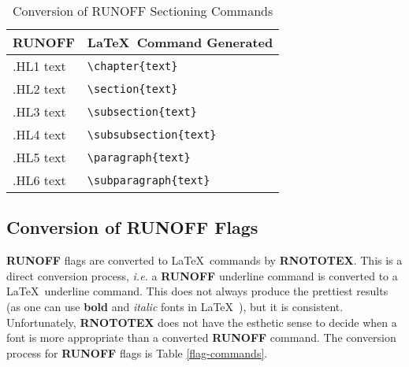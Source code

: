 \begin{table}[h]
\begin{center}
\begin{tabular}{ll}
{\large\bf RUNOFF }	    & {\LaTeX\ \large\bf Command Generated} \\ \hline
 .HL1 text      & \verb+\chapter{text}+ \\
 .HL2 text      & \verb+\section{text}+ \\
 .HL3 text      & \verb+\subsection{text}+ \\
 .HL4 text      & \verb+\subsubsection{text}+ \\
 .HL5 text      & \verb+\paragraph{text}+ \\
 .HL6 text      & \verb+\subparagraph{text}+ \\ \hline
\end{tabular}
\caption{Conversion of RUNOFF Sectioning Commands\label{section-commands}}
\end{center}
\end{table}

\subsection{Conversion of RUNOFF Flags}

{\bf RUNOFF} flags are converted to \LaTeX\ commands by {\bf RNOTOTEX}.   This
is a direct conversion process, {\em i.e.} a {\bf RUNOFF} underline command is
converted to a \LaTeX\ underline command.  This does not always produce the
prettiest results (as one can use {\bf bold} and {\it italic} fonts in \LaTeX\
), but it is consistent.  Unfortunately, {\bf RNOTOTEX} does not have the
esthetic sense to decide when a font is more appropriate than \index{esthetic
sense} a converted {\bf RUNOFF} command.  The conversion process for {\bf
RUNOFF} flags is Table \ref{flag-commands}. 

